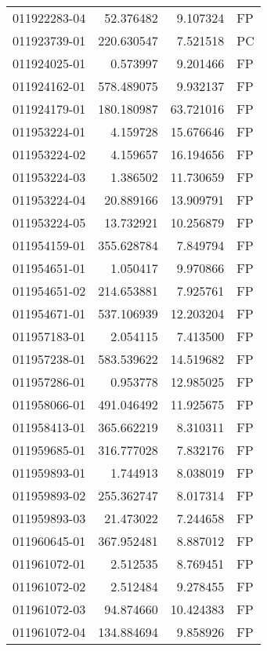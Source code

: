 \begin{tabular}{lrrl}
011922283-04 &   52.376482 &       9.107324 &   FP \\
011923739-01 &  220.630547 &       7.521518 &   PC \\
011924025-01 &    0.573997 &       9.201466 &   FP \\
011924162-01 &  578.489075 &       9.932137 &   FP \\
011924179-01 &  180.180987 &      63.721016 &   FP \\
011953224-01 &    4.159728 &      15.676646 &   FP \\
011953224-02 &    4.159657 &      16.194656 &   FP \\
011953224-03 &    1.386502 &      11.730659 &   FP \\
011953224-04 &   20.889166 &      13.909791 &   FP \\
011953224-05 &   13.732921 &      10.256879 &   FP \\
011954159-01 &  355.628784 &       7.849794 &   FP \\
011954651-01 &    1.050417 &       9.970866 &   FP \\
011954651-02 &  214.653881 &       7.925761 &   FP \\
011954671-01 &  537.106939 &      12.203204 &   FP \\
011957183-01 &    2.054115 &       7.413500 &   FP \\
011957238-01 &  583.539622 &      14.519682 &   FP \\
011957286-01 &    0.953778 &      12.985025 &   FP \\
011958066-01 &  491.046492 &      11.925675 &   FP \\
011958413-01 &  365.662219 &       8.310311 &   FP \\
011959685-01 &  316.777028 &       7.832176 &   FP \\
011959893-01 &    1.744913 &       8.038019 &   FP \\
011959893-02 &  255.362747 &       8.017314 &   FP \\
011959893-03 &   21.473022 &       7.244658 &   FP \\
011960645-01 &  367.952481 &       8.887012 &   FP \\
011961072-01 &    2.512535 &       8.769451 &   FP \\
011961072-02 &    2.512484 &       9.278455 &   FP \\
011961072-03 &   94.874660 &      10.424383 &   FP \\
011961072-04 &  134.884694 &       9.858926 &   FP \\

\end{tabular}
